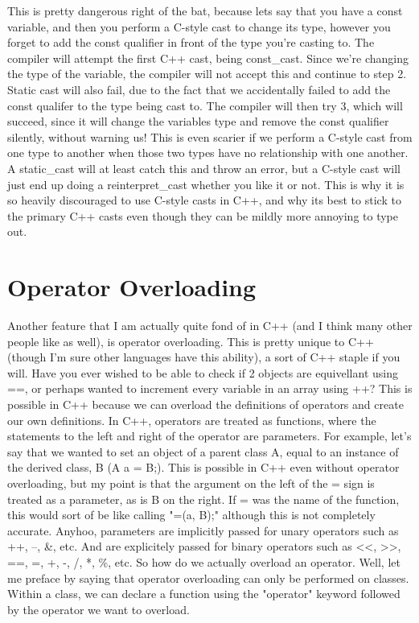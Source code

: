 \documentclass{article}
\begin{document}
This is pretty dangerous right of the bat, because lets say that you have a const variable, and then you
perform a C-style cast to change its type, however you forget to add the const qualifier in front of the type
you’re casting to. The compiler will attempt the first C++ cast, being const\_cast. Since we’re changing the
type of the variable, the compiler will not accept this and continue to step 2. Static cast will also fail,
due to the fact that we accidentally failed to add the const qualifer to the type being cast to. The compiler
will then try 3, which will succeed, since it will change the variables type and remove the const qualifier
silently, without warning us! This is even scarier if we perform a C-style cast from one type to another when
those two types have no relationship with one another. A static\_cast will at least catch this and throw an
error, but a C-style cast will just end up doing a reinterpret\_cast whether you like it or not. This is why
it is so heavily discouraged to use C-style casts in C++, and why its best to stick to the primary C++ casts
even though they can be mildly more annoying to type out.

\section{Operator Overloading}

Another feature that I am actually quite fond of in C++ (and I think many other people like as well), is
operator overloading. This is pretty unique to C++ (though I’m sure other languages have this ability), a
sort of C++ staple if you will. Have you ever wished to be able to check if 2 objects are equivellant using
==, or perhaps wanted to increment every variable in an array using ++? This is possible in C++ because we
can overload the definitions of operators and create our own definitions. In C++, operators are treated as
functions, where the statements to the left and right of the operator are parameters. For example, let's say
that we wanted to set an object of a parent class A, equal to an instance of the derived class, B (A a = B;).
This is possible in C++ even without operator overloading, but my point is that the argument on the left of
the = sign is treated as a parameter, as is B on the right. If = was the name of the function, this would
sort of be like calling "=(a, B);" although this is not completely accurate. Anyhoo, parameters are implicitly
passed for unary operators such as ++, --, \&, etc. And are explicitely passed for binary operators such as
<<, >>, ==, =, +, -, /, *, \%, etc. So how do we actually overload an operator. Well, let me preface by
saying that operator overloading can only be performed on classes. Within a class, we can declare a function
using the "operator" keyword followed by the operator we want to overload.
\end{document}
